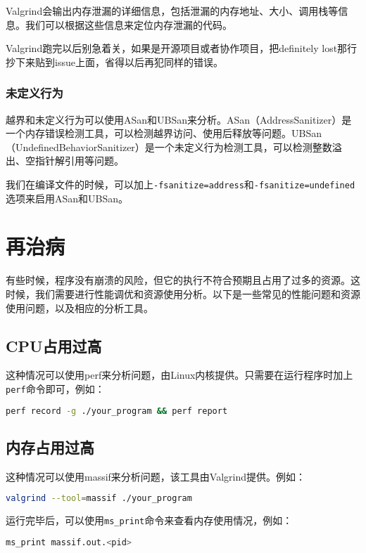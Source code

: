 Valgrind会输出内存泄漏的详细信息，包括泄漏的内存地址、大小、调用栈等信息。我们可以根据这些信息来定位内存泄漏的代码。

Valgrind跑完以后别急着关，如果是开源项目或者协作项目，把definitely lost那行抄下来贴到issue上面，省得以后再犯同样的错误。

\subsubsection{未定义行为}

越界和未定义行为可以使用ASan和UBSan来分析。ASan（AddressSanitizer）是一个内存错误检测工具，可以检测越界访问、使用后释放等问题。UBSan（UndefinedBehaviorSanitizer）是一个未定义行为检测工具，可以检测整数溢出、空指针解引用等问题。

我们在编译文件的时候，可以加上\texttt{-fsanitize=address}和\texttt{-fsanitize=undefined}选项来启用ASan和UBSan。

\section{再治病}

有些时候，程序没有崩溃的风险，但它的执行不符合预期且占用了过多的资源。这时候，我们需要进行性能调优和资源使用分析。以下是一些常见的性能问题和资源使用问题，以及相应的分析工具。

\subsection{CPU占用过高}

这种情况可以使用perf来分析问题，由Linux内核提供。只需要在运行程序时加上\texttt{perf}命令即可，例如：
\begin{lstlisting}[language=bash]
    perf record -g ./your_program && perf report
\end{lstlisting}

\subsection{内存占用过高}

这种情况可以使用massif来分析问题，该工具由Valgrind提供。例如：
\begin{lstlisting}[language=bash]
    valgrind --tool=massif ./your_program
\end{lstlisting}

运行完毕后，可以使用\texttt{ms\_print}命令来查看内存使用情况，例如：
\begin{lstlisting}[language=bash]
    ms_print massif.out.<pid>
\end{lstlisting}

